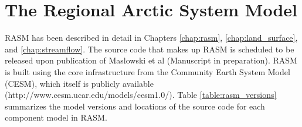 \section{The Regional Arctic System Model}
\label{sec:rasm_dev}

RASM has been described in detail in Chapters \ref{chap:rasm}, \ref{chap:land_surface}, and \ref{chap:streamflow}.
The source code that makes up RASM is scheduled to be released upon publication of Maslowski et al (Manuscript in preparation).
RASM is built using the core infrastructure from the Community Earth System Model (CESM), which itself is publicly available (http://www.cesm.ucar.edu/models/cesm1.0/).
Table \ref{table:rasm_versions} summarizes the model versions and locations of the source code for each component model in RASM.

\begin{table}[]
\centering
\caption{Versions and primary citations for core RASM component models.}
\label{table:rasm_versions}
\end{table}

